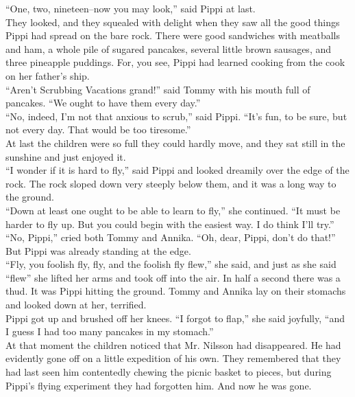 \documentclass{standard}
\begin{document}
“One, two, nineteen--now you may look,” said Pippi at last.\\

They looked, and they squealed with delight when they saw all the good things Pippi had spread on the bare rock. There were good sandwiches with meatballs and ham, a whole pile of sugared pancakes, several little brown sausages, and three pineapple puddings. For, you see, Pippi had learned cooking from the cook on her father’s ship.\\

“Aren’t Scrubbing Vacations grand!” said Tommy with his mouth full of pancakes. “We ought to have them every day.”\\

“No, indeed, I’m not that anxious to scrub,” said Pippi. “It’s fun, to be sure, but not every day. That would be too tiresome.”\\

At last the children were so full they could hardly move, and they sat still in the sunshine and just enjoyed it.\\

“I wonder if it is hard to fly,” said Pippi and looked dreamily over the edge of the rock. The rock sloped down very steeply below them, and it was a long way to the ground.\\

“Down at least one ought to be able to learn to fly,” she continued. “It must be harder to fly up. But you could begin with the easiest way. I do think I’ll try.”\\

“No, Pippi,” cried both Tommy and Annika. “Oh, dear, Pippi, don’t do that!”\\

But Pippi was already standing at the edge.\\

“Fly, you foolish fly, fly, and the foolish fly flew,” she said, and just as she said “flew” she lifted her arms and took off into the air. In half a second there was a thud. It was Pippi hitting the ground. Tommy and Annika lay on their stomachs and looked down at her, terrified.\\

Pippi got up and brushed off her knees. “I forgot to flap,” she said joyfully, “and I guess I had too many pancakes in my stomach.”\\

At that moment the children noticed that Mr. Nilsson had disappeared. He had evidently gone off on a little expedition of his own. They remembered that they had last seen him contentedly chewing the picnic basket to pieces, but during Pippi’s flying experiment they had forgotten him. And now he was gone.\\
\end{document}
